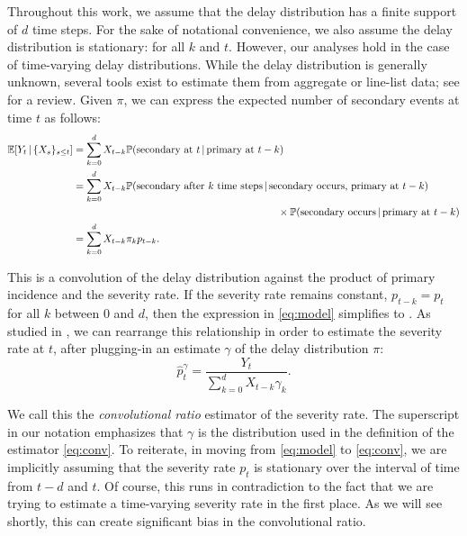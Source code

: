 \documentclass{article}
\renewcommand{\hat}{\widehat} %
\newcommand{\given}{\, \vert \,}
\begin{document}
Throughout this work, we assume that the delay distribution has a finite support
of $d$ time steps. 
For the sake of notational convenience, we also assume the delay distribution is stationary:
 for all $k$ and $t$. 
However, our analyses hold in the case of time-varying delay distributions.
While the delay distribution is generally unknown,
several tools exist to estimate them from aggregate or line-list data; see
\citealp{delay_distrs} for a review. Given $\pi$, we can express the
expected number of secondary events at time $t$ as follows: 
\begin{align}
\E[Y_t \given \{X_s\}_{s\leq t}]
&= \sum_{k=0}^d X_{t-k} \P(\text{secondary at $t$} \given \text{primary at
  $t-k$}) \nonumber \\   
&= \sum_{k=0}^d X_{t-k} \P(\text{secondary after $k$ time steps} \given
  \text{secondary occurs, primary at $t-k$}) \nonumber \\
&\hspace{200pt} \times\P(\text{secondary occurs} \given\text{primary at $t-k$})
  \nonumber \\  
\label{eq:model}
&= \sum_{k=0}^d X_{t-k} \pi_k p_{t-k}.
\end{align}

This is a convolution of the delay distribution against the product of primary
incidence and the severity rate. If the severity rate remains constant, $p_{t-k}
= p_t$ for all $k$ between $0$ and $d$, then the expression in \eqref{eq:model}
simplifies to \smash{$\E[Y_t \given \{X_s\}_{s\leq t}] = p_t \sum_{k=0}^d
  X_{t-k} \pi_k$}. As studied in \citet{UKpaper}, we can rearrange this
relationship in order to estimate the severity rate at $t$, after plugging-in an
estimate $\gamma$ of the delay distribution $\pi$:   
\begin{equation}
\label{eq:conv}
\hat{p}_t^\gamma = \frac{Y_t}{\sum_{k=0}^d X_{t-k} \gamma_k}.
\end{equation}

We call this the \emph{convolutional ratio} estimator of the severity rate. The superscript in our notation \smash{$\hat{p}_t^\gamma$} emphasizes that
$\gamma$ is the distribution used in the definition of the estimator
\eqref{eq:conv}. To reiterate, in moving from \eqref{eq:model} to
\eqref{eq:conv}, we are implicitly assuming that the severity rate $p_t$ is
stationary over the interval of time from $t-d$ and $t$. Of course, this runs in
contradiction to the fact that we are trying to estimate a time-varying severity
rate in the first place. As we will see shortly, this can create significant
bias in the convolutional ratio.  
\end{document}
